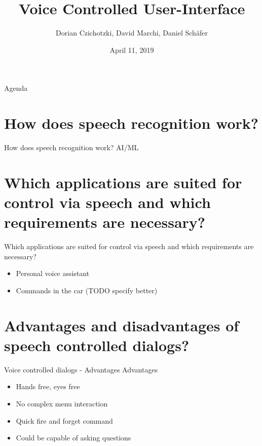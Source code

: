 \documentclass[
  10pt
, handout
]{beamer}
\title{Voice Controlled User-Interface}
\subtitle{}
\date{April 11, 2019}
\author{Dorian Czichotzki, David Marchi, Daniel Schäfer}
\begin{document}
\maketitle

\begin{frame}{Agenda}
  \tableofcontents[pausesections]
\end{frame}

\section{How does speech recognition work?}  %

\begin{frame}{How does speech recognition work?}
  AI/ML
\end{frame}

\section{Which applications are suited for control via speech and which requirements are necessary?}  %

\begin{frame}{Which applications are suited for control via speech and which requirements are necessary?}
  \begin{itemize}
    \item Personal voice assistant
    \item Commands in the car (TODO specify better)
  \end{itemize}
\end{frame}

\section{Advantages and disadvantages of speech controlled dialogs?}  %

\begin{frame}{Voice controlled dialogs - Advantages}
  Advantages

  \begin{itemize}
    \item<1-> Hands free, eyes free
    \item<2-> No complex menu interaction
    \item<3-> Quick fire and forget command
    \item<4-> Could be capable of asking questions
  \end{itemize}
\end{frame}
\end{document}
